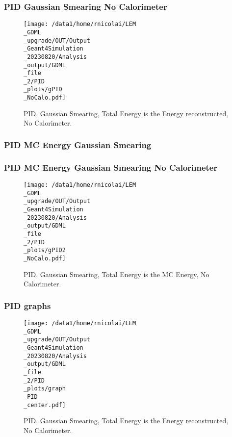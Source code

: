 \documentclass[8pt]{beamer}
\begin{document}
            \begin{frame}
                \frametitle{PID Gaussian Smearing No Calorimeter}
            
        \begin{figure}[h]
            \centering
            \texttt{[image: /data1/home/rnicolai/LEM\\\_GDML\\\_upgrade/OUT/Output\\\_Geant4Simulation\\\_20230820/Analysis\\\_output/GDML\\\_file\\\_2/PID\\\_plots/gPID\\\_NoCalo.pdf]}
            \caption{PID, Gaussian Smearing, Total Energy is the Energy reconstructed, No Calorimeter.}
        \end{figure}
        
            \end{frame}
            
            \begin{frame}
                \frametitle{PID MC Energy Gaussian Smearing}
            
            \end{frame}
            
            \begin{frame}
                \frametitle{PID MC Energy Gaussian Smearing No Calorimeter}
            
        \begin{figure}[h]
            \centering
            \texttt{[image: /data1/home/rnicolai/LEM\\\_GDML\\\_upgrade/OUT/Output\\\_Geant4Simulation\\\_20230820/Analysis\\\_output/GDML\\\_file\\\_2/PID\\\_plots/gPID2\\\_NoCalo.pdf]}
            \caption{PID, Gaussian Smearing, Total Energy is the MC Energy, No Calorimeter.}
        \end{figure}
        
            \end{frame}
            
            \begin{frame}
                \frametitle{PID graphs}
            
        \begin{figure}[h]
            \centering
            \texttt{[image: /data1/home/rnicolai/LEM\\\_GDML\\\_upgrade/OUT/Output\\\_Geant4Simulation\\\_20230820/Analysis\\\_output/GDML\\\_file\\\_2/PID\\\_plots/graph\\\_PID\\\_center.pdf]}
            \caption{PID, Gaussian Smearing, Total Energy is the Energy reconstructed, No Calorimeter.}
        \end{figure}
        
            \end{frame}
            
\end{document}
